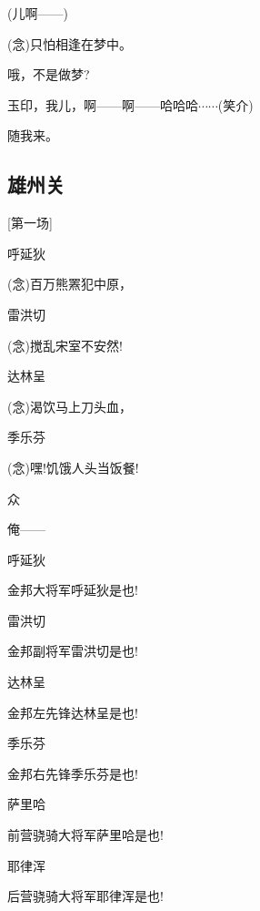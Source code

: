 {(儿啊------)}

{({\akai 念})只怕相逢在梦中。}

{哦，不是做梦?}

{玉印，我儿，啊------啊------哈哈哈$\cdots{}\cdots{}$(笑介)}

{随我来。}

\newpage

\hypertarget{ux96c4ux5ddeux5173}{%

\subsection{雄州关}\label{ux96c4ux5ddeux5173}}

{{[}第一场{]}}

{呼延狄\hspace{20pt}~

({\akai 念})百万熊罴犯中原，}

{雷洪切\hspace{20pt}~

({\akai 念})搅乱宋室不安然!}

{达林呈\hspace{20pt}~

({\akai 念})渴饮马上刀头血，}

{季乐芬\hspace{20pt}~

({\akai 念})嘿!饥饿人头当饭餐!}

{众\hspace{40pt}~

俺------}

{呼延狄\hspace{20pt}~

金邦大将军呼延狄是也!}

{雷洪切\hspace{20pt}~

金邦副将军雷洪切是也!}

{达林呈\hspace{20pt}~

金邦左先锋达林呈是也!}

{季乐芬\hspace{20pt}~

金邦右先锋季乐芬是也!}

{萨里哈\hspace{20pt}~

前营骁骑大将军萨里哈是也!}

{耶律浑\hspace{20pt}~

后营骁骑大将军耶律浑是也!}

